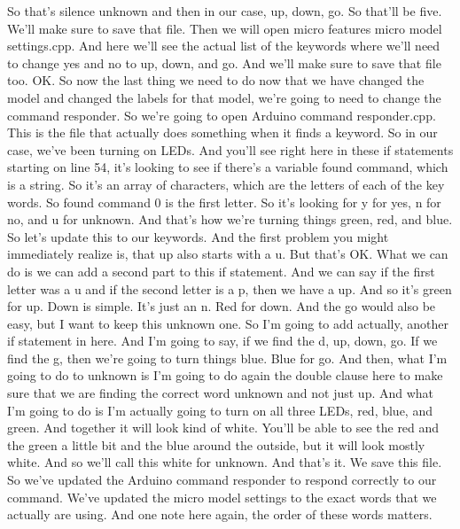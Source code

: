     So that's silence unknown and then in our case, up, down, go.
    So that'll be five.
    We'll make sure to save that file.
    Then we will open micro features micro model settings.cpp.
    And here we'll see the actual list of the keywords
    where we'll need to change yes and no to up, down, and go.
    And we'll make sure to save that file too.
    OK.
    So now the last thing we need to do now that we have changed the model
    and changed the labels for that model, we're
    going to need to change the command responder.
    So we're going to open Arduino command responder.cpp.
    This is the file that actually does something when it finds a keyword.
    So in our case, we've been turning on LEDs.
    And you'll see right here in these if statements starting on line 54,
    it's looking to see if there's a variable
    found command, which is a string.
    So it's an array of characters, which are
    the letters of each of the key words.
    So found command 0 is the first letter.
    So it's looking for y for yes, n for no, and u for unknown.
    And that's how we're turning things green, red, and blue.
    So let's update this to our keywords.
    And the first problem you might immediately realize
    is, that up also starts with a u.
    But that's OK.
    What we can do is we can add a second part to this if statement.
    And we can say if the first letter was a u and if the second letter is a p,
    then we have a up.
    And so it's green for up.
    Down is simple.
    It's just an n.
    Red for down.
    And the go would also be easy, but I want to keep this unknown one.
    So I'm going to add actually, another if statement in here.
    And I'm going to say, if we find the d, up, down, go.
    If we find the g, then we're going to turn things blue.
    Blue for go.
    And then, what I'm going to do to unknown
    is I'm going to do again the double clause here
    to make sure that we are finding the correct word unknown and not just up.
    And what I'm going to do is I'm actually going to turn on all three LEDs,
    red, blue, and green.
    And together it will look kind of white.
    You'll be able to see the red and the green a little bit
    and the blue around the outside, but it will look mostly white.
    And so we'll call this white for unknown.
    And that's it.
    We save this file.
    So we've updated the Arduino command responder
    to respond correctly to our command.
    We've updated the micro model settings to the exact words
    that we actually are using.
    And one note here again, the order of these words matters.
